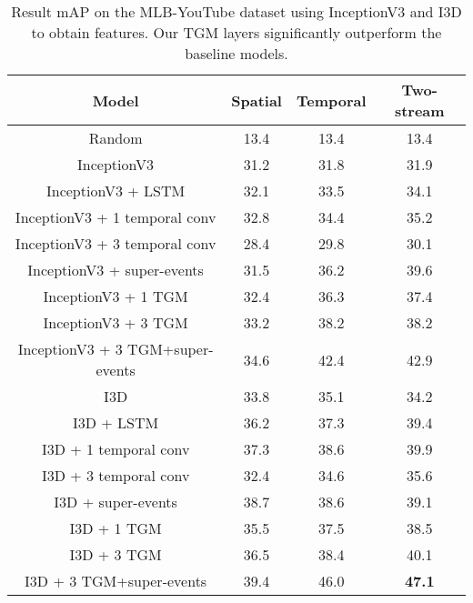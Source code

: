 \documentclass{article}
\begin{document}
\begin{table*}
\caption{Result mAP on the MLB-YouTube dataset using InceptionV3 and I3D to obtain features. Our TGM layers significantly outperform the baseline models. }
\label{tab:mlb-youtube}
\centering
\begin{tabular}{c|ccc}
\toprule
Model                            & Spatial   & Temporal  & Two-stream \\
\midrule
Random                           & 13.4 & 13.4 & 13.4  \\
\midrule
InceptionV3                      & 31.2 & 31.8 & 31.9 \\
InceptionV3 + LSTM               & 32.1 & 33.5 & 34.1 \\
InceptionV3 + 1 temporal conv               & 32.8 & 34.4 & 35.2 \\
InceptionV3 + 3 temporal conv               & 28.4 & 29.8 & 30.1 \\
InceptionV3 + super-events       & 31.5 & 36.2 & 39.6 \\
InceptionV3 + 1 TGM              & 32.4 & 36.3 & 37.4 \\
InceptionV3 + 3 TGM              & 33.2 & 38.2 & 38.2 \\
InceptionV3 + 3 TGM+super-events & 34.6 & 42.4 & 42.9 \\
\midrule
I3D                      & 33.8 & 35.1 & 34.2 \\
I3D + LSTM               & 36.2 & 37.3 & 39.4 \\
I3D + 1 temporal conv               & 37.3 & 38.6 & 39.9 \\
I3D + 3 temporal conv               & 32.4 & 34.6 & 35.6 \\
I3D + super-events       & 38.7 & 38.6 & 39.1 \\
I3D + 1 TGM              & 35.5 & 37.5 & 38.5 \\
I3D + 3 TGM              & 36.5 & 38.4 & 40.1  \\
I3D + 3 TGM+super-events & 39.4 & 46.0 & \bf{47.1} \\
\bottomrule
\end{tabular}
\end{table*}
\end{document}
